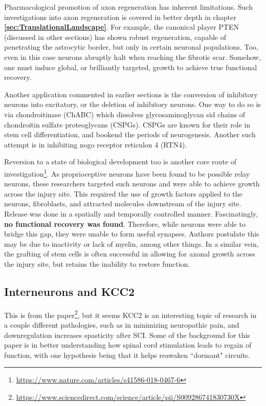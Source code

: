 \documentclass[12pt]{report}
\begin{document}
Pharmacological promotion of axon regeneration has inherent limitations. Such investigations into axon regeneration is covered in better depth in chapter \textbf{\ref{sec:TranslationalLandscape}}. For example, the canonical player PTEN (discussed in other sections) has shown robust regeneration, capable of penetrating the astrocytic border, but only in certain neuronal populations. Too, even in this case neurons abruptly halt when reaching the fibrotic scar. Somehow, one must induce global, or brilliantly targeted, growth to achieve true functional recovery. \newline

Another application commented in earlier sections is the conversion of inhibitory neurons into excitatory, or the deletion of inhibitory neurons. One way to do so is via chondroitinase (ChABC) which dissolves glycosaminoglycan sid chains of chondroitin sulfate proteoglycans (CSPGs). CSPGs are known for their role in stem cell differentiation, and bookend the periods of neurogenesis. Another such attempt is in inhibiting nogo receptor reticulon 4 (RTN4). \newline

Reversion to a state of biological development too is another core route of investigation\footnote{\url{https://www.nature.com/articles/s41586-018-0467-6}}. As proprioceptive neurons have been found to be possible relay neurons, these researchers targeted such neurons and were able to achieve growth across the injury site. This required the use of growth factors applied to the neurons, fibroblasts, and attracted molecules downstream of the injury site. Release was done in a spatially and temporally controlled manner. Fascinatingly, \textbf{no functional recovery was found}. Therefore, while neurons were able to bridge this gap, they were unable to form useful synapses. Authors postulate this may be due to inactivity or lack of myelin, among other things. In a similar vein, the grafting of stem cells is often successful in allowing for axonal growth across the injury site, but retains the inability to restore function.\newline

\subsection{Interneurons and KCC2}
\label{sec:KCC2}

This is from the paper\footnote{\url{https://www.sciencedirect.com/science/article/pii/S009286741830730X}}, but it seems KCC2 is an interesting topic of research in a couple different pathologies, such as in minimizing neuropathic pain, and downregulation increases spasticity after SCI. Some of the background for this paper is in better understanding how spinal cord stimulation leads to regain of function, with one hypothesis being that it helps reawaken ``dormant" circuits.\newline
\end{document}
